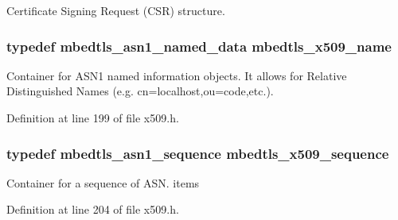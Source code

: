 Certificate Signing Request (C\-S\-R) structure. \hypertarget{group__x509__module_ga2272228c7776102328df31623af3168c}{
\subsubsection[{mbedtls\-\_\-x509\-\_\-name}]{\setlength{\rightskip}{0pt plus 5cm}typedef {\bf mbedtls\-\_\-asn1\-\_\-named\-\_\-data} {\bf mbedtls\-\_\-x509\-\_\-name}}}\label{group__x509__module_ga2272228c7776102328df31623af3168c}
Container for A\-S\-N1 named information objects. It allows for Relative Distinguished Names (e.\-g. cn=localhost,ou=code,etc.). 

Definition at line 199 of file x509.\-h.

\hypertarget{group__x509__module_gabd52d60a09315854d9ef849d02154f35}{
\subsubsection[{mbedtls\-\_\-x509\-\_\-sequence}]{\setlength{\rightskip}{0pt plus 5cm}typedef {\bf mbedtls\-\_\-asn1\-\_\-sequence} {\bf mbedtls\-\_\-x509\-\_\-sequence}}}\label{group__x509__module_gabd52d60a09315854d9ef849d02154f35}
Container for a sequence of A\-S\-N. items 

Definition at line 204 of file x509.\-h.

